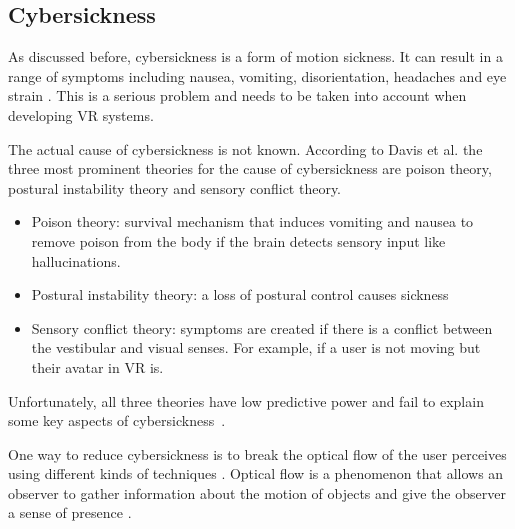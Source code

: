 \subsection{Cybersickness}\label{cybersickness}

As discussed before, cybersickness is a form of motion sickness. It can
result in a range of symptoms including nausea, vomiting,
disorientation, headaches and eye strain
\cite{LaViola}. This is a serious problem and needs to
be taken into account when developing VR systems.

The actual cause of cybersickness is not known. According to Davis et al. \cite{Davis} the three most prominent theories for the cause of cybersickness are poison theory, postural instability theory and sensory conflict theory.

\begin{itemize}
\itemsep1pt\parskip0pt
\item
  Poison theory: survival mechanism that induces vomiting and nausea to
  remove poison from the body if the brain detects sensory input like
  hallucinations.\\
\item
  Postural instability theory: a loss of postural control causes
  sickness\\
\item
  Sensory conflict theory: symptoms are created if there is a conflict
  between the vestibular and visual senses. For example, if a user is not
  moving but their avatar in VR is.
\end{itemize}

Unfortunately, all three theories have low predictive power and fail to
explain some key aspects of cybersickness~\cite{Davis}.

One way to reduce cybersickness is to break the optical flow of the user
perceives using different kinds of techniques
\cite{Bhandari}. Optical flow is a phenomenon that
allows an observer to gather information about the motion of objects and
give the observer a sense of presence \cite{Gibson}.

